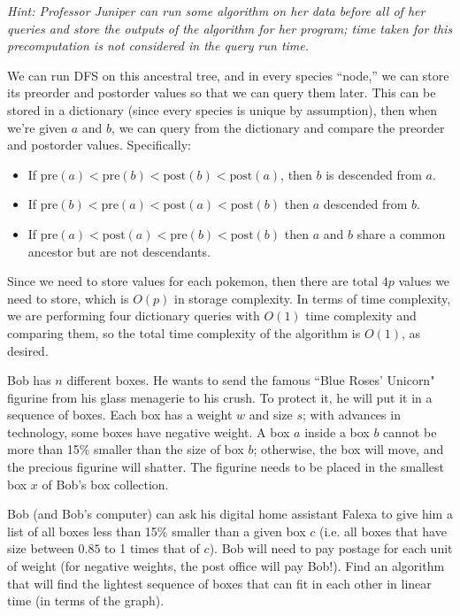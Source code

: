 \documentclass[10.5pt]{article}
\newcommand{\pre}{\mathrm{pre}}
\newcommand{\post}{\mathrm{post}}
\begin{document}
\begin{subparts}
    \emph{Hint: Professor Juniper can run some algorithm on her data before all of her queries and store the outputs of the algorithm for her program; time taken for this precomputation is not considered in the query run time.}
   
	\begin{solution}
		We can run DFS on this ancestral tree, and in every species ``node,'' we can store its preorder
		and postorder values so that we can query them later. This can be stored in a dictionary (since every 
		species is unique by assumption), then when we're given $a$ and $b$, we can query from the dictionary 
		and compare the preorder and postorder values. Specifically:
		\begin{itemize}
			\item If $\pre(a) < \pre(b) < \post(b) < \post(a)$, then $b$ is descended from $a$.
			\item If $\pre(b) < \pre(a) < \post(a) < \post(b)$ then $a$ descended from $b$.
			\item If $\pre(a) < \post(a) < \pre(b) < \post(b)$ then $a$ and $b$ share a common ancestor 
				but are not descendants.
		\end{itemize}
		Since we need to store values for each pokemon, then there are total $4p$ values we need to 
		store, which is $O(p)$ in storage complexity. In terms of time complexity, we are performing four 
		dictionary queries with $O(1)$ time complexity and comparing them, so the total time complexity of 
		the algorithm is $O(1)$, as desired.
	\end{solution}
    \subpart Bob has $n$ different boxes. He wants to send the famous ``Blue Roses' Unicorn" figurine from his glass menagerie to his crush. To protect it, he will put it in a sequence of boxes. Each box has a weight $w$ and size $s$; with advances in technology, some boxes have negative weight. A box $a$ inside a box $b$ cannot be more than 15\% smaller than the size of box $b$; otherwise, the box will move, and the precious figurine will shatter. The figurine needs to be placed in the smallest box $x$ of Bob's box collection. 
    
Bob (and Bob's computer) can ask his digital home assistant Falexa to give him a list of all boxes less than 15\% smaller than a given box $c$ (i.e. all boxes that have size between $0.85$ to 1 times that of $c$). Bob will need to pay postage for each unit of weight (for negative weights, the post office will pay Bob!). Find an algorithm that will find the lightest sequence of boxes that can fit in each other in linear time (in terms of the graph). 


\end{subparts}
\end{document}
